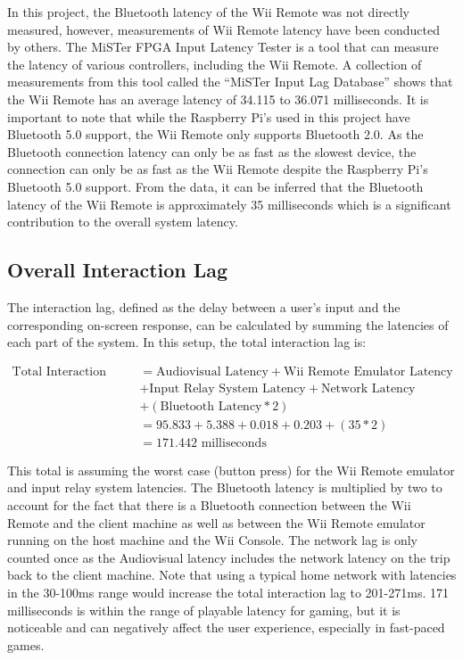 In this project, the Bluetooth latency of the Wii Remote was not directly
measured, however, measurements of Wii Remote latency have been conducted by
others. The MiSTer FPGA Input Latency Tester\cite{cathoderayblogTestYour} is a
tool that can measure the latency of various controllers, including the Wii
Remote. A collection of measurements from this tool called the ``MiSTer Input
Lag Database''\cite{misterInputLagDatabase} shows that the Wii Remote has an
average latency of 34.115 to 36.071 milliseconds. It is important to note that
while the Raspberry Pi's used in this project have Bluetooth 5.0 support\cite{raspberrypiPi5}, the
Wii Remote only supports Bluetooth 2.0\cite{wikipediaWii}. As the Bluetooth connection latency can
only be as fast as the slowest device, the connection can only be as fast as the
Wii Remote despite the Raspberry Pi's Bluetooth 5.0 support. From the data, it
can be inferred that the Bluetooth latency of the Wii Remote is approximately 35
milliseconds which is a significant contribution to the overall system latency.

\subsection{Overall Interaction Lag}

The interaction lag, defined as the delay between a user’s input and the
corresponding on-screen response\cite{volkerseekerBestPaper}, can be calculated by
summing the latencies of each part of the system. In this setup, the total interaction lag is:

\begin{align*}
  \text{Total Interaction Lag} &= \text{Audiovisual Latency} + \text{Wii Remote Emulator Latency} \\
  &+ \text{Input Relay System Latency} + \text{Network Latency} \\
  &+ (\text{Bluetooth Latency} * 2) \\
  &= 95.833 + 5.388 + 0.018 + 0.203 + (35 * 2) \\
  &= 171.442 \text{ milliseconds}
\end{align*}

This total is assuming the worst case (button press) for the Wii Remote emulator
and input relay system latencies. The Bluetooth latency is multiplied by two to
account for the fact that there is a Bluetooth connection between the Wii Remote
and the client machine as well as between the Wii Remote emulator running on the
host machine and the Wii Console. The network lag is only counted once as the
Audiovisual latency includes the network latency on the trip back to the client
machine. Note that using a typical home network with latencies in the 30-100ms
range would increase the total interaction lag to 201-271ms. 171 milliseconds is
within the range of playable latency for gaming\cite{latency_playable}, but it is
noticeable and can negatively affect the user experience, especially in fast-paced games\cite{latency_bad}.


